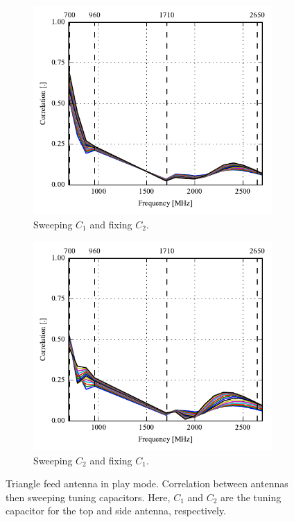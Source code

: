 \begin{figure}[htbp]
    \centering
    \begin{subfigure}{0.49\linewidth}
        \includegraphics{img/tech_sol/trianglefeed/play_mode/correlation_Csh1-sweep}
        \caption{Sweeping $C_1$ and fixing $C_2$.}
    \end{subfigure}
    \hfill
    \begin{subfigure}{0.49\linewidth}
        \includegraphics{img/tech_sol/trianglefeed/play_mode/correlation_Csh2-sweep}
        \caption{Sweeping $C_2$ and fixing $C_1$.}
    \end{subfigure}
    \caption{Triangle feed antenna in play mode. Correlation between antennas then sweeping tuning capacitors. Here, $C_1$ and $C_2$ are the tuning capacitor for the top and side antenna, respectively.}
    \label{fig:corr_sol2_play}
\end{figure}


